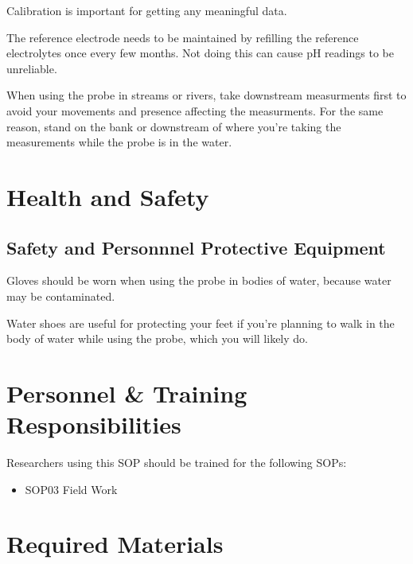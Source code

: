 \documentclass[12pt]{../SOP3}\usepackage[]{graphicx}\usepackage[]{color}
\begin{document}
\NP Calibration is important for getting any meaningful data. 


\NP The reference electrode needs to be maintained by refilling the reference electrolytes once every few months. Not doing this can cause pH readings to be unreliable. 

\NP When using the probe in streams or rivers, take downstream measurments first to avoid your movements and presence affecting the measurments. For the same reason, stand on the bank or downstream of where you're taking the measurements while the probe is in the water.  

\section{Health and Safety}

\subsection{Safety and Personnnel Protective Equipment}

\NP Gloves should be worn when using the probe in bodies of water, because water may be contaminated. 

\NP Water shoes are useful for protecting your feet if you're planning to walk in the body of water while using the probe, which you will likely do. 

\section{Personnel \& Training Responsibilities}

Researchers using this SOP should be trained for the following SOPs:

\begin{itemize}
  \item SOP03 Field Work
\end{itemize}

\section{Required Materials}




\end{document}
